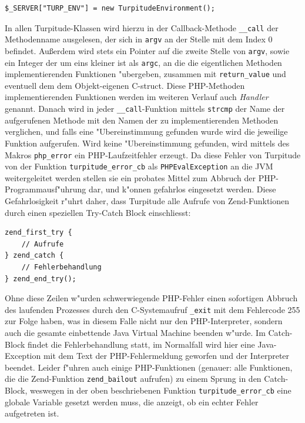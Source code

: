 \begin{lstlisting}[caption=TurpitudeEnvironment in \$\_SERVER einf"ugen]
$_SERVER["TURP_ENV"] = new TurpitudeEnvironment();
\end{lstlisting}

In allen Turpitude-Klassen wird hierzu in der Callback-Methode \texttt{\_\_call} der 
Methodenname ausgelesen, der sich in \texttt{argv} an der Stelle mit dem Index 0 befindet. Au\ss erdem wird stets ein Pointer auf die zweite Stelle
von \texttt{argv}, sowie ein Integer der um eins kleiner ist als \texttt{argc}, an die die eigentlichen
Methoden implementierenden Funktionen "ubergeben, zusammen mit \texttt{return\_value} und eventuell dem dem Objekt-eigenen C-struct.
Diese PHP-Methoden implementierenden Funktionen werden im weiteren Verlauf auch \emph{Handler} genannt.
Danach wird in jeder \texttt{\_\_call}-Funktion mittels \texttt{strcmp} der Name der aufgerufenen Methode mit den Namen der zu implementierenden 
Methoden verglichen, und falls eine "Ubereinstimmung gefunden wurde wird die jeweilige Funktion aufgerufen. Wird keine "Ubereinstimmung
gefunden, wird mittels des Makros \texttt{php\_error} ein PHP-Laufzeitfehler erzeugt. Da diese Fehler von Turpitude von der Funktion
\texttt{turpitude\_error\_cb} als \texttt{PHPEvalException} an die JVM weitergeleitet werden stellen sie ein probates Mittel zum Abbruch
der PHP-Programmausf"uhrung dar, und k"onnen gefahrlos eingesetzt werden. 
Diese Gefahrlosigkeit r"uhrt daher, dass Turpitude alle Aufrufe von Zend-Funktionen durch einen speziellen Try-Catch Block einschliesst:

\begin{lstlisting}[caption=Zend Try-Catch Block]
zend_first_try {
    // Aufrufe
} zend_catch {
    // Fehlerbehandlung
} zend_end_try();
\end{lstlisting}

Ohne diese Zeilen w"urden schwerwiegende PHP-Fehler einen sofortigen Abbruch des laufenden Prozesses durch den C-Systemaufruf
\texttt{\_exit} mit dem Fehlercode 255 zur Folge haben, was in diesem Falle nicht nur den PHP-Interpreter, sondern auch die gesamte 
einbettende Java Virtual Machine beenden w"urde. Im Catch-Block findet die Fehlerbehandlung statt, im Normalfall wird hier eine
Java-Exception mit dem Text der PHP-Fehlermeldung geworfen und der Interpreter beendet. Leider f"uhren auch einige PHP-Funktionen
(genauer: alle Funktionen, die die Zend-Funktion \texttt{zend\_bailout} aufrufen)
zu einem Sprung in den Catch-Block, weswegen in der oben beschriebenen Funktion \texttt{turpitude\_error\_cb} eine globale Variable
gesetzt werden muss, die anzeigt, ob ein echter Fehler aufgetreten ist.

